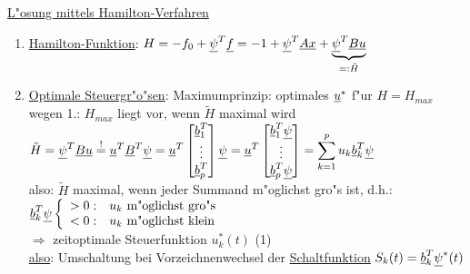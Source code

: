 \documentclass[openany,a4paper,11pt]{book}
\begin{document}
\uline{L"osung mittels Hamilton-Verfahren}\begin{enumerate}
    \item \uline{Hamilton-Funktion}: \quad $H=-f_0+\uline{\psi}^T\uline{f}=-1+\uline{\psi}^T\uline{Ax}+\underbrace{\uline{\psi}^T\uline{Bu}}_{=:\tilde{H}}$
    \item \uline{Optimale Steuergr"o"sen}: Maximumprinzip: optimales $\uline{u}^*$ f"ur $H=H_{max}$\\
    wegen 1.: $H_{max}$ liegt vor, wenn $\tilde{H}$ maximal wird\\
    $\displaystyle\tilde{H}=\uline{\psi}^T\uline{Bu}\stackrel{!}{=}\uline{u}^T\uline{B}^T\uline{\psi}=\uline{u}^T\begin{bmatrix}\uline{b}_1^T\\ \vdots\\\uline{b}_p^T\end{bmatrix}\uline{\psi}=\uline{u}^T\begin{bmatrix}\uline{b}_1^T\uline{\psi}\\ \vdots\\\uline{b}_p^T\uline{\psi}\end{bmatrix}=\sum^{p}_{k=1}u_k\uline{b}_k^T\uline{\psi}$\\
    also: $\tilde{H}$ maximal, wenn jeder Summand m"oglichst gro"s ist, d.h.: 
    $\uline{b}_k^T\uline{\psi}\left \{%
    \begin{array}{ll}
        >0: & u_k \text{ m"oglichst gro"s}\\
        <0: & u_k \text{ m"oglichst klein}\\
    \end{array} \right.$\\
    $\Rightarrow$ zeitoptimale Steuerfunktion $u_k^*(t)$
     \quad (1)\\
    \uline{also}: Umschaltung bei Vorzeichnenwechsel der \uline{Schaltfunktion} $S_k(t)=\uline{b}_k^T\uline{\psi}^*(t)$
\end{enumerate}
\end{document}
